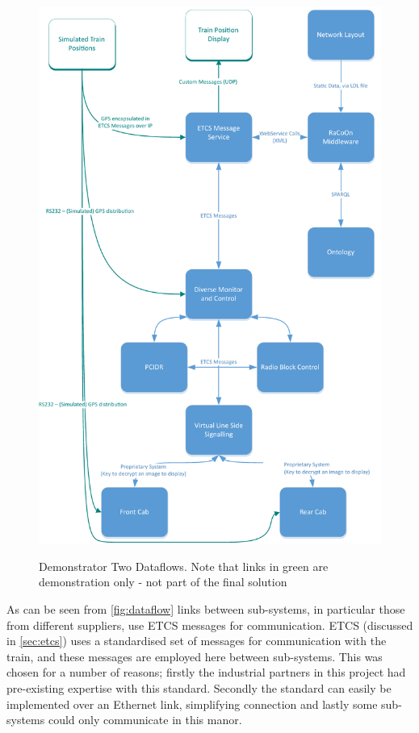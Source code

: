 \begin{figure}[H]
\myfloatalign
{\includegraphics[max height=\textheight,max width=\linewidth]{gfx/Dataflow-StirDemoActive}} 
\caption{Demonstrator Two Dataflows. Note that links in green are demonstration only - not part of the final solution}
\label{fig:dataflow}
\end{figure}

As can be seen from \autoref{fig:dataflow} links between sub-systems, in particular those from different suppliers, use ETCS messages for communication. ETCS (discussed in \autoref{sec:etcs}) uses a standardised set of messages for communication with the train, and these messages are employed here between sub-systems. This was chosen for a number of reasons; firstly the industrial partners in this project had pre-existing expertise with this standard. Secondly the standard can easily be implemented over an Ethernet link, simplifying connection and lastly some sub-systems could only communicate in this manor. 

